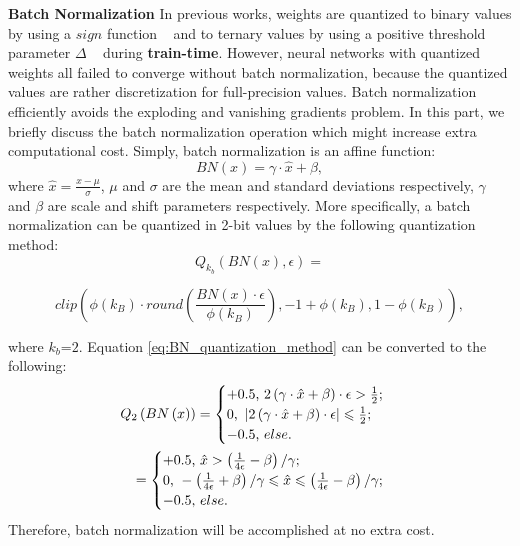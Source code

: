 \documentclass[twoside,twocolumn]{article}
\begin{document}
\noindent\textbf{Batch Normalization} In previous works, weights are quantized to binary values by using a $sign$ function ~\cite{b16} and to ternary values by using a positive threshold parameter $\Delta$ ~\cite{b36} during \textbf{train-time}. However, neural networks with quantized weights all failed to converge without batch normalization, because the quantized values are rather discretization for full-precision values. Batch normalization ~\cite{b50} efficiently avoids the exploding and vanishing gradients problem. In this part, we briefly discuss the batch normalization operation which might increase extra computational cost. Simply, batch normalization is an affine function:
\begin{equation}\label{eq:BN affine function}
BN\left(x \right) =\gamma \cdot \hat{x}+\beta,
\end{equation}
where $\hat{x}=\frac{x-\mu}{\sigma}$, $\mu$ and $\sigma$ are the mean and standard deviations respectively, $\gamma$ and $\beta$ are scale and shift parameters respectively. More specifically, a batch normalization can be quantized in 2-bit values by the following quantization method:
\begin{equation}\label{eq:BN_quantization_method}
Q_{k_b}\left( BN\left( x \right) ,\epsilon \right) =
\end{equation}
\begin{small}
$$
clip\left( \phi \left( k_B \right) \cdot round\left( \frac{BN\left( x \right) \cdot \epsilon}{\phi \left( k_B \right)} \right) ,-1+\phi \left( k_B \right) ,1-\phi \left( k_B \right) \right),
$$
\end{small}

\noindent where $k_b$=$2$. Equation \eqref{eq:BN_quantization_method} can be converted to the following:
\begin{equation}\label{eq:BN_convert}
\begin{split}
Q_2\left( BN\left( x \right) \right) =\begin{cases}
	+\text{0.5,\,\,}2\left( \gamma \cdot \hat{x}+\beta \right) \cdot \epsilon >\frac{1}{2};\\
	\text{0,\,\,}\left| 2\left( \gamma \cdot \hat{x}+\beta \right) \cdot \epsilon \right|\leqslant \frac{1}{2};\\
	-\text{0.5,\,\,}else.\\
\end{cases}
\\
=\begin{cases}
	+\text{0.5,\ }\hat{x}> \left( \frac{1}{4\epsilon}-\beta \right) /\gamma ;\\
	\text{0,\ }-\left( \frac{1}{4\epsilon}+\beta \right) /\gamma \leqslant \hat{x} \leqslant \left( \frac{1}{4\epsilon}-\beta \right) /\gamma ;\\
	-\text{0.5,\ }else.\\
\end{cases}
\end{split}
\end{equation}
Therefore, batch normalization will be accomplished at no extra cost.
\end{document}
